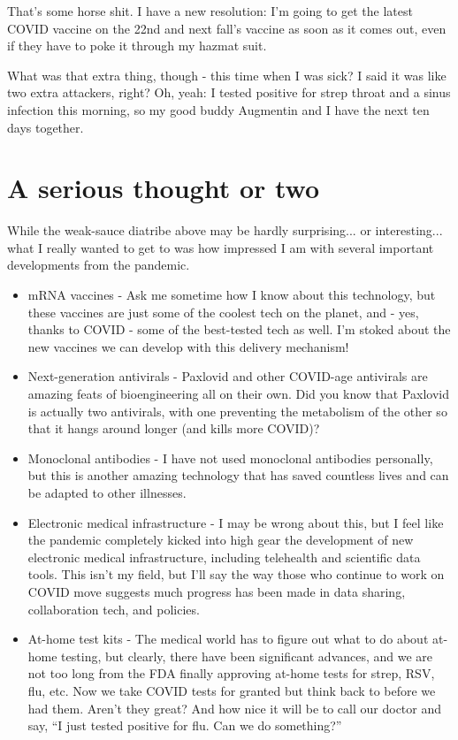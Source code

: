 \documentclass{article}
\begin{document}
That's some horse shit. I have a new resolution: I'm going to get the latest COVID vaccine on the 22nd and next fall's vaccine as soon as it comes out, even if they have to poke it through my hazmat suit.

What was that extra thing, though - this time when I was sick? I said it was like two extra attackers, right? Oh, yeah: I tested positive for strep throat and a sinus infection this morning, so my good buddy Augmentin and I have the next ten days together.

\section{A serious thought or two}

While the weak-sauce diatribe above may be hardly surprising... or interesting... what I really wanted to get to was how impressed I am with several important developments from the pandemic.
\begin{itemize}
\item mRNA vaccines - Ask me sometime how I know about this technology, but these vaccines are just some of the coolest tech on the planet, and - yes, thanks to COVID - some of the best-tested tech as well. I'm stoked about the new vaccines we can develop with this delivery mechanism!
\item Next-generation antivirals - Paxlovid and other COVID-age antivirals are amazing feats of bioengineering all on their own. Did you know that Paxlovid is actually two antivirals, with one preventing the metabolism of the other so that it hangs around longer (and kills more COVID)?
\item Monoclonal antibodies - I have not used monoclonal antibodies personally, but this is another amazing technology that has saved countless lives and can be adapted to other illnesses.
\item Electronic medical infrastructure - I may be wrong about this, but I feel like the pandemic completely kicked into high gear the development of new electronic medical infrastructure, including telehealth and scientific data tools. This isn't my field, but I'll say the way those who continue to work on COVID move suggests much progress has been made in data sharing, collaboration tech, and policies.
\item At-home test kits - The medical world has to figure out what to do about at-home testing, but clearly, there have been significant advances, and we are not too long from the FDA finally approving at-home tests for strep, RSV, flu, etc. Now we take COVID tests for granted but think back to before we had them. Aren't they great? And how nice it will be to call our doctor and say, ``I just tested positive for flu. Can we do something?''
\end{itemize}
\end{document}
